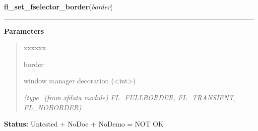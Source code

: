 \hspace{.8\funcindent}\begin{boxedminipage}{\funcwidth}

    \raggedright \textbf{fl\_set\_fselector\_border}(\textit{border})

    \vspace{-1.5ex}

    \rule{\textwidth}{0.5\fboxrule}
\setlength{\parskip}{2ex}
\setlength{\parskip}{1ex}
      \textbf{Parameters}
      \vspace{-1ex}

      \begin{quote}
        \begin{Ventry}{xxxxxx}

          \item[border]

          window manager decoration ({\textless}int{\textgreater})

            {\it (type=(from xfdata module) FL\_FULLBORDER, FL\_TRANSIENT, FL\_NOBORDER)}

        \end{Ventry}

      \end{quote}

\textbf{Status:} Untested + NoDoc + NoDemo = NOT OK



    \end{boxedminipage}

    \label{xformslib:library:fl_set_fselector_transient}

    \vspace{0.5ex}

